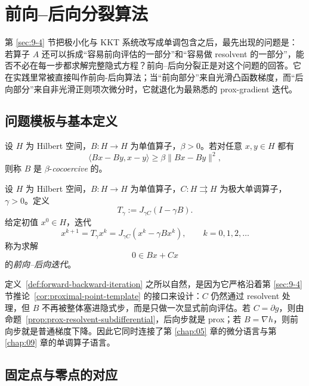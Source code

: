 \section{前向--后向分裂算法}

\label{sec:10-1}

第 \ref{sec:9-4} 节把极小化与 KKT 系统改写成单调包含之后，最先出现的问题是：若算子 $A$ 还可以拆成“容易前向评估的一部分”和“容易做 resolvent 的一部分”，能否不必在每一步都求解完整隐式方程？前向--后向分裂正是对这个问题的回答。它在实践里常被直接叫作前向-后向算法；当“前向部分”来自光滑凸函数梯度，而“后向部分”来自非光滑正则项次微分时，它就退化为最熟悉的 prox-gradient 迭代。

\subsection{问题模板与基本定义}

\begin{definition}[cocoercive 算子]\label{def:cocoercive-operator}
设 $H$ 为 Hilbert 空间，$B\colon H\to H$ 为单值算子，$\beta>0$。若对任意 $x,y\in H$ 都有
\[
\langle Bx-By,x-y\rangle \ge \beta \|Bx-By\|^2,
\]
则称 $B$ 是 $\beta$-\emph{cocoercive} 的。
\end{definition}

\begin{definition}[前向--后向迭代]\label{def:forward-backward-iteration}
设 $H$ 为 Hilbert 空间，$B\colon H\to H$ 为单值算子，$C\colon H\rightrightarrows H$ 为极大单调算子，$\gamma>0$。定义
\[
T_\gamma:=J_{\gamma C}(I-\gamma B).
\]
给定初值 $x^0\in H$，迭代
\[
x^{k+1}=T_\gamma x^k=J_{\gamma C}(x^k-\gamma Bx^k),\qquad k=0,1,2,\dots
\]
称为求解
\[
0\in Bx+Cx
\]
的\emph{前向--后向迭代}。
\end{definition}

\begin{remark}
定义~\ref{def:forward-backward-iteration} 之所以自然，是因为它严格沿着第 \ref{sec:9-4} 节推论~\ref{cor:proximal-point-template} 的接口来设计：$C$ 仍然通过 resolvent 处理，但 $B$ 不再被整体塞进隐式步，而是只做一次显式前向评估。若 $C=\partial g$，则由命题~\ref{prop:prox-resolvent-subdifferential}，后向步就是 prox；若 $B=\nabla h$，则前向步就是普通梯度下降。因此它同时连接了第 \ref{chap:05} 章的微分语言与第 \ref{chap:09} 章的单调算子语言。
\end{remark}

\subsection{固定点与零点的对应}

